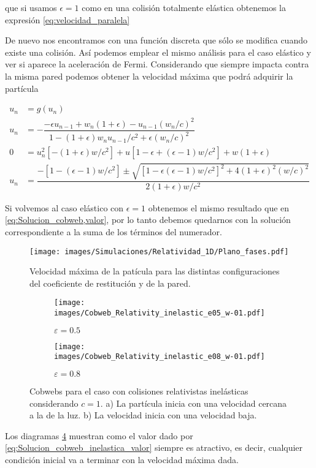 \documentclass[11pt, spanish]{book}
\begin{document}
que si usamos \( \epsilon = 1 \) como en una colisión totalmente elástica obtenemos la expresión \ref{eq:velocidad_paralela}

\vspace{3mm}

De nuevo nos encontramos con una función discreta que sólo se modifica cuando existe una colisión. Así podemos emplear el mismo análisis para el caso elástico y ver si aparece la aceleración de Fermi. Considerando que siempre impacta contra la misma pared podemos obtener la velocidad máxima que podrá adquirir la partícula

\begin{align}\label{eq:Solucion_cobweb_inelastica}
    u_n &= g(u_n) \nonumber\\
    u_n &= -\dfrac{-\epsilon u_{n-1} + w_n(1+\epsilon) -  u_{n-1}(w_n/c)^2}{1 - (1+\epsilon)w_n u_{n-1}/c^2 + \epsilon(w_n/c)^2} \\
    0 &= u_n^2\left[ -(1+\epsilon)w/c^2 \right] + u\left[ 1 - \epsilon + (\epsilon - 1)w/c^2 \right] + w(1+\epsilon) \nonumber\\
    u_n &= \dfrac{-\left[ 1 -  (\epsilon - 1)w/c^2 \right] \pm \sqrt{\left[ 1 - \epsilon (\epsilon - 1)w/c^2 \right]^2 + 4(1+\epsilon)^2(w/c)^2}}{2(1+\epsilon)w/c^2} \label{eq:Solucion_cobweb_inelastica_valor}
\end{align}

Si volvemos al caso elástico con \( \epsilon = 1 \) obtenemos el mismo resultado que en \ref{eq:Solucion_cobweb,valor}, por lo tanto debemos quedarnos con la solución correspondiente a la suma de los términos del numerador. 

\begin{figure}[H]
    \centering
    \texttt{[image: images/Simulaciones/Relatividad\_1D/Plano\_fases.pdf]}
    \caption{Velocidad máxima de la patícula para las distintas configuraciones del coeficiente de restitución y de la pared.}
    \label{fig:plano_fases_coef_wall}
\end{figure}

\begin{figure}[H]
    \centering
    \begin{subfigure}[b]{0.49\textwidth}
        \centering
        \texttt{[image: images/Cobweb\_Relativity\_inelastic\_e05\_w-01.pdf]}
        \caption{$\varepsilon = 0.5$}
        \label{fig:Cobweb_inelastics_A}
    \end{subfigure}
    \hfill
    \begin{subfigure}[b]{0.49\textwidth}
        \centering
        \texttt{[image: images/Cobweb\_Relativity\_inelastic\_e08\_w-01.pdf]}
        \caption{$\varepsilon = 0.8$}
        \label{fig:Cobweb_inelastics_B}
    \end{subfigure}
    \caption{Cobwebs para el caso con colisiones relativistas inelásticas considerando $c=1$. a) La partícula inicia con una velocidad cercana a la de la luz. b) La velocidad inicia con una velocidad baja. }
        \label{fig:Cobweb_inelastics}
\end{figure}

Los diagramas \ref{fig:Cobweb_inelastics} muestran como el valor dado por \ref{eq:Solucion_cobweb_inelastica_valor} siempre es atractivo, es decir, cualquier condición inicial va a terminar con la velocidad máxima dada.
\end{document}
